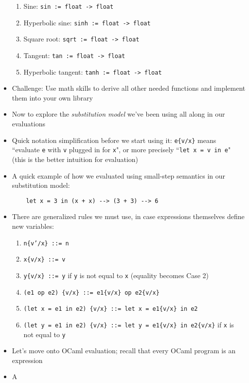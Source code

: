 \begin{itemize}
\begin{enumerate}
        \item Sine: \texttt{sin := float -> float}
        \item Hyperbolic sine: \texttt{sinh := float -> float}
        \item Square root: \texttt{sqrt := float -> float}
        \item Tangent: \texttt{tan := float -> float}
        \item Hyperbolic tangent: \texttt{tanh := float -> float}
    \end{enumerate}
    \item Challenge: Use math skills to derive all other needed functions and implement them into your own library
    \item Now to explore the \textit{substitution model} we've been using all along in our evaluations
    \item Quick notation simplification before we start using it: \texttt{e\{v/x\}} means ``evaluate \texttt{e} with \texttt{v} plugged in for \texttt{x}", or more precisely ``\lstinline{let x = v in e}" (this is the better intuition for evaluation)
    \item A quick example of how we evaluated using small-step semantics in our substitution model:
    \begin{lstlisting}
    let x = 3 in (x + x) --> (3 + 3) --> 6
    \end{lstlisting}
    \item There are generalized rules we must use, in case expressions themselves define new variables:
    \begin{enumerate}
        \item \texttt{n\{v'/x\} ::= n}
        \item \texttt{x\{v/x\} ::= v}
        \item \texttt{y\{v/x\} ::= y} if \texttt{y} is not equal to \texttt{x} (equality becomes Case 2)
        \item \texttt{(e1 op e2) \{v/x\} ::= e1\{v/x\} op e2\{v/x\}}
        \item \texttt{(let x = e1 in e2) \{v/x\} ::= let x = e1\{v/x\} in e2}
        \item \texttt{(let y = e1 in e2) \{v/x\} ::= let y = e1\{v/x\} in e2\{v/x\}} if \texttt{x} is not equal to \texttt{y}
    \end{enumerate}
    \item Let's move onto \textsf{OCaml} evaluation; recall that every \textsf{OCaml} program is an expression
    \item A
\end{itemize}
